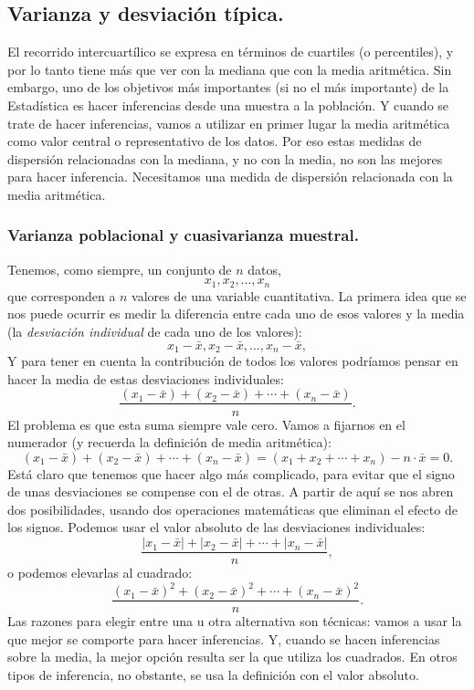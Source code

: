 \subsection{Varianza y desviación típica.}
\label{cap02:subsec:VarianzaDesviacionTipica}

El recorrido intercuartílico se expresa en términos de cuartiles (o percentiles), y por lo tanto
tiene más que ver con la mediana que con la media aritmética. Sin embargo, uno de los objetivos más
importantes (si no el más importante) de la Estadística es hacer inferencias desde una muestra a la
población. Y cuando se trate de hacer inferencias, vamos a utilizar en primer lugar la media
aritmética como valor central o representativo de los datos. Por eso estas medidas de dispersión
relacionadas con la mediana, y no con la media, no son las mejores para hacer inferencia. {\sf
Necesitamos una medida de dispersión relacionada con la media aritmética.}

\subsubsection*{Varianza poblacional y cuasivarianza muestral.}


Tenemos, como siempre, un conjunto de $n$ datos,
\[x_1,x_2,\ldots,x_n\]
que corresponden a $n$ valores de una {\sf variable cuantitativa.} La primera
idea que se nos puede ocurrir es medir la diferencia entre cada uno de esos
valores y la media (la {\em desviación individual} de cada uno de los valores):
\[x_1-\bar x, x_2-\bar x,\ldots, x_n-\bar x,\]
Y para tener en cuenta la contribución de todos los valores podríamos pensar en hacer la media de estas desviaciones individuales:
\[\dfrac{(x_1-\bar x)+(x_2-\bar x)+\cdots+(x_n-\bar x)}{n}.\]
El problema es que esta suma siempre vale cero. Vamos a fijarnos en el numerador (y recuerda la definición de media aritmética):
\begin{equation}\label{cap02:ecu:SumaDesviacionesIgual0}
    (x_1-\bar x)+(x_2-\bar x)+\cdots+(x_n-\bar x)=(x_1+x_2+\cdots+x_n)-n\cdot\bar x=0.
\end{equation}
Está claro que tenemos que hacer algo más complicado, para evitar que el signo
de unas desviaciones se compense con el de otras. A partir de aquí se nos abren
dos posibilidades, usando dos operaciones matemáticas que eliminan el efecto de
los signos. Podemos usar el valor absoluto de las desviaciones individuales:
\[\dfrac{|x_1-\bar x|+|x_2-\bar x|+\cdots+|x_n-\bar x|}{n},\]
o podemos elevarlas al cuadrado:
\[\dfrac{(x_1-\bar x)^2+(x_2-\bar x)^2+\cdots+(x_n-\bar x)^2}{n}.\]
Las razones para elegir entre una u otra alternativa son técnicas: vamos a usar
la que mejor se comporte para hacer inferencias. Y, cuando se hacen inferencias
sobre la media, la mejor opción resulta ser la que utiliza los cuadrados. En
otros tipos de inferencia, no obstante, se usa la definición con el valor
absoluto.

